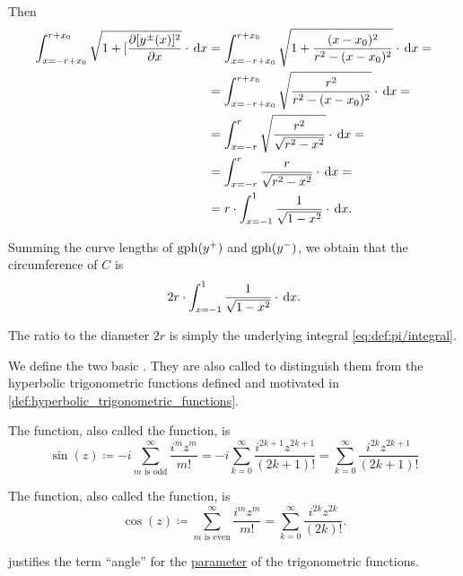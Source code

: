 \begin{defproof}
  Then
  \begin{align*}
    \int_{x=-r + x_0}^{r + x_0} \sqrt{ 1 + [\diffp {[y^\pm(x)]^2} x } \cdot \dl x
    &=
    \int_{x=-r + x_0}^{r + x_0} \sqrt{ 1 + \frac {(x - x_0)^2} { r^2 - (x - x_0)^2 } } \cdot \dl x
    = \\ &=
    \int_{x=-r + x_0}^{r + x_0} \sqrt{ \frac {r^2} { r^2 - (x - x_0)^2 } } \cdot \dl x
    = \\ &=
    \int_{x=-r}^r \sqrt{ \frac {r^2} { \sqrt{r^2 - x^2} } } \cdot \dl x
    = \\ &=
    \int_{x=-r}^r \frac r { \sqrt{r^2 - x^2} } \cdot \dl x
    = \\ &=
    r \cdot \int_{x=-1}^1 \frac 1 { \sqrt{1 - x^2} } \cdot \dl x.
  \end{align*}

  Summing the curve lengths of \( \operatorname{gph}(y^+) \) and \( \operatorname{gph}(y^-) \), we obtain that the circumference of \( C \) is
  \begin{equation*}
    2r \cdot \int_{x=-1}^1 \frac 1 { \sqrt{1 - x^2} } \cdot \dl x.
  \end{equation*}

  The ratio to the diameter \( 2r \) is simply the underlying integral \eqref{eq:def:pi/integral}.
\end{defproof}

\begin{definition}\label{def:trigonometric_functions}
  We define the two basic . They are also called  to distinguish them from the hyperbolic trigonometric functions defined and motivated in \cref{def:hyperbolic_trigonometric_functions}.

  \begin{thmenum}
     The  function, also called the  function, is
    \begin{equation*}
      \sin(z)
      \coloneqq
      -i \sum_{m \text{ is odd}}^\infty \frac {i^m z^m} {m!}
      =
      -i \sum_{k=0}^\infty \frac {i^{2k+1} z^{2k+1}} {(2k + 1)!}
      =
      \sum_{k=0}^\infty \frac {i^{2k} z^{2k+1}} {(2k + 1)!}
    \end{equation*}

     The  function, also called the  function, is
    \begin{equation*}
      \cos(z)
      \coloneqq
      \sum_{m \text{ is even}}^\infty \frac {i^m z^m} {m!}
      =
      \sum_{k=0}^\infty \frac {i^{2k} z^{2k}} {(2k)!}.
    \end{equation*}
  \end{thmenum}

   justifies the term \enquote{angle} for the \hyperref[con:function_arguments]{parameter} of the trigonometric functions.
\end{definition}

